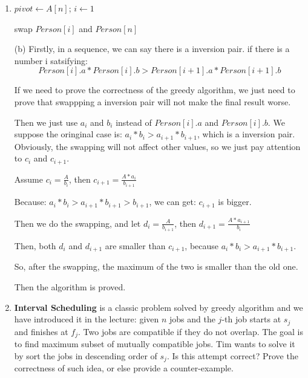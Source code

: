 \documentclass[12pt,a4paper]{article}
\makeatletter
\newtheorem*{solution}{Solution}
\theoremstyle{definition}
\renewenvironment{solution}[1][Solution] {\par\pushQED{\qed}\normalfont\topsep6\p@\@plus6\p@\relax\trivlist\item[\hskip\labelsep\bfseries#1\@addpunct{.}]\ignorespaces}{\popQED\endtrivlist\@endpefalse} \makeatother
\makeatother
\begin{document}
\begin{enumerate}
\begin{solution}
\begin{minipage}[t]{0.8\textwidth}
\begin{algorithm}[H]
     		$pivot \leftarrow A[n]$; $i \leftarrow 1$\;
     		
     		swap $Person[i]$ and $Person[n]$\;
     	\end{algorithm}
     \end{minipage}
    \end{solution}
   
   (b)
   Firstly, in a sequence, we can say there is a inversion pair. if there is a number i satsifying: $$ Person[i].a*Person[i].b > Person[i+1].a*Person[i+1].b$$
   
   If we need to prove the correctness of the greedy algorithm, we just need to prove that swappping a inversion pair will not make the final result worse.
   
   Then we just use $a_i$ and $b_i$ instead of $Person[i].a$ and $Person[i].b$.
   We suppose the oringinal case is: $a_i*b_i > a_{i+1}*b_{i+1}$, which is a inversion  pair. Obviously, the swapping will not affect other values, so we just pay attention to $c_i$ and $c_{i+1}$.
   
   Assume $c_i=\frac{A}{b_i}$, then $c_{i+1}=\frac{A*a_i}{b_{i+1}}$
   
   Because: $a_i*b_i>a_{i+1}*b_{i+1}>b_{i+1}$, we can get: $c_{i+1}$ is bigger.
   
   Then we do the swapping, and let $d_i=\frac{A}{b_{i+1}}$, then $d_{i+1}=\frac{A*a_{i+1}}{b_i}$
   
   Then, both $d_{i}$ and $d_{i+1}$ are smaller than $c_{i+1}$, because $a_i*b_i > a_{i+1}*b_{i+1}$.
   
   So, after the swapping, the maximum of the two is smaller than the old one. 
   
   Then the algorithm is proved.
   
   
   
   
 

    \item
    \textbf{Interval Scheduling} is a classic problem solved by greedy algorithm and we have introduced it in the lecture: given $n$ jobs and the $j$-th job starts at $s_j$ and finishes at $f_j$. Two jobs are compatible if they do not overlap. The goal is to find maximum subset of mutually compatible jobs. Tim wants to solve it by sort the jobs in descending order of $s_j$. Is this attempt correct? Prove the correctness of such idea, or else provide a counter-example.


\end{enumerate}
\end{document}

